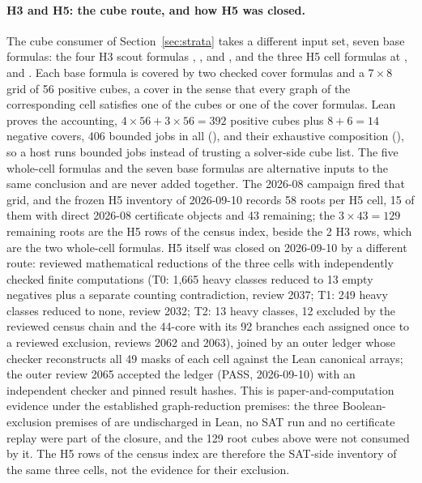 \documentclass{anvil-paper}
\theoremstyle{definition}
\begin{document}
\paragraph{H3 and H5: the cube route, and how H5 was closed.} The cube consumer of Section~\ref{sec:strata} takes a different input set, seven base formulas: the four H3 scout formulas , ,  and , and the three H5 cell formulas  at ,  and . Each base formula is covered by two checked cover formulas and a $7\times 8$ grid of 56 positive cubes, a cover in the sense that every graph of the corresponding cell satisfies one of the cubes or one of the cover formulas. Lean proves the accounting, $4\times 56+3\times 56=392$ positive cubes plus $8+6=14$ negative covers, 406 bounded jobs in all (), and their exhaustive composition (), so a host runs bounded jobs instead of trusting a solver-side cube list. The five whole-cell formulas and the seven base formulas are alternative inputs to the same conclusion and are never added together. The 2026-08 campaign fired that grid, and the frozen H5 inventory of 2026-09-10 records 58 roots per H5 cell, 15 of them with direct 2026-08 certificate objects and 43 remaining; the $3\times 43=129$ remaining roots are the H5 rows of the census index, beside the 2 H3 rows, which are the two whole-cell formulas. H5 itself was closed on 2026-09-10 by a different route: reviewed mathematical reductions of the three cells with independently checked finite computations (T0: 1,665 heavy classes reduced to 13 empty negatives plus a separate counting contradiction, review 2037; T1: 249 heavy classes reduced to none, review 2032; T2: 13 heavy classes, 12 excluded by the reviewed census chain and the 44-core with its 92 branches each assigned once to a reviewed exclusion, reviews 2062 and 2063), joined by an outer ledger whose checker reconstructs all 49 masks of each cell against the Lean canonical arrays; the outer review 2065 accepted the ledger (PASS, 2026-09-10) with an independent checker and pinned result hashes. This is paper-and-computation evidence under the established graph-reduction premises: the three Boolean-exclusion premises of  are undischarged in Lean, no SAT run and no certificate replay were part of the closure, and the 129 root cubes above were not consumed by it. The H5 rows of the census index are therefore the SAT-side inventory of the same three cells, not the evidence for their exclusion.
\end{document}
